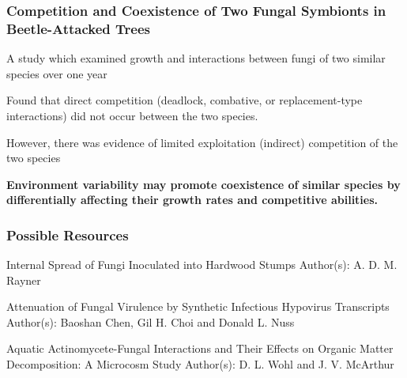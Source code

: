 \documentclass{beamer}
\begin{document}
\begin{frame}
\frametitle{Competition and Coexistence of Two Fungal Symbionts in Beetle-Attacked Trees}

A study which examined growth and interactions between fungi of two similar species over one year

\bigskip

Found that direct competition (deadlock, combative, or replacement-type interactions) did not occur between the two species.

\bigskip

However, there was evidence of limited exploitation (indirect) competition of the two species

\bigskip

\textbf{Environment variability may promote coexistence of similar species by differentially affecting their growth rates and competitive abilities.}


\end{frame}

\begin{frame}
\frametitle{Possible Resources}

Internal Spread of Fungi Inoculated into Hardwood Stumps Author(s): A. D. M. Rayner
\bigskip

Attenuation of Fungal Virulence by Synthetic Infectious Hypovirus Transcripts Author(s): Baoshan Chen, Gil H. Choi and Donald L. Nuss
\bigskip

Aquatic Actinomycete-Fungal Interactions and Their Effects on Organic Matter
Decomposition: A Microcosm Study
Author(s): D. L. Wohl and J. V. McArthur
\end{frame}
\end{document}
